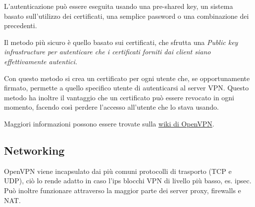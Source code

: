 L'autenticazione può essere eseguita usando una pre-shared key, un sistema basato sull'utilizzo dei certificati, una semplice password o una combinazione dei precedenti.

Il metodo più sicuro è quello basato sui certificati, che sfrutta una \it{Public key infrastructure} \cite{pki} per autenticare che i certificati forniti dai client siano effettivamente autentici.

Con questo metodo si crea un certificato per ogni utente che, se opportunamente firmato, permette a quello specifico utente di autenticarsi al server VPN. Questo metodo ha inoltre il vantaggio che un certificato può essere revocato in ogni momento, facendo così perdere l'accesso all'utente che lo stava usando. 

Maggiori informazioni possono essere trovate sulla \href{https://community.openvpn.net/openvpn/wiki/How_does_PKI_work}{wiki di OpenVPN}.

\subsection{Networking}

OpenVPN viene incapsulato dai più comuni protocolli di trasporto (TCP e UDP), ciò lo rende adatto in caso l'ips blocchi VPN di livello più basso, es. ipsec. Può inoltre funzionare attraverso la maggior parte dei server proxy, firewalls e NAT.

